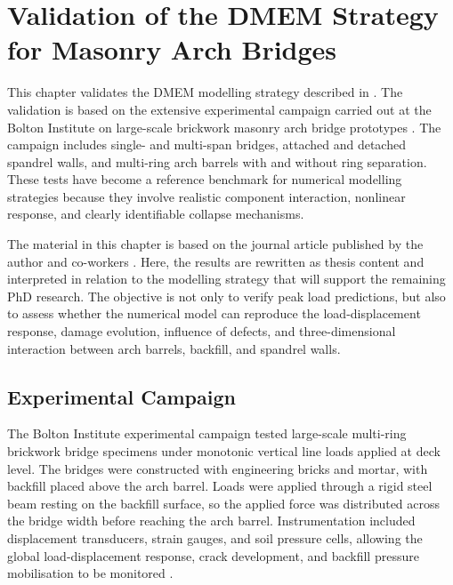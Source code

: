 

\chapter{Validation of the DMEM Strategy for Masonry Arch Bridges}
\label{cha:dmem-validation}

This chapter validates the \gls{DMEM} modelling strategy described in . The validation is based on the extensive experimental campaign carried out at the Bolton Institute on large-scale brickwork masonry arch bridge prototypes \cite{Melbourne1995,Melbourne1997}. The campaign includes single- and multi-span bridges, attached and detached spandrel walls, and multi-ring arch barrels with and without ring separation. These tests have become a reference benchmark for numerical modelling strategies because they involve realistic component interaction, nonlinear response, and clearly identifiable collapse mechanisms.

The material in this chapter is based on the journal article published by the author and co-workers \cite{Bonatte2026DMEM}. Here, the results are rewritten as thesis content and interpreted in relation to the modelling strategy that will support the remaining PhD research. The objective is not only to verify peak load predictions, but also to assess whether the numerical model can reproduce the load-displacement response, damage evolution, influence of defects, and three-dimensional interaction between arch barrels, backfill, and spandrel walls.

\section{Experimental Campaign}
\label{sec:bolton-campaign}

The Bolton Institute experimental campaign tested large-scale multi-ring brickwork bridge specimens under monotonic vertical line loads applied at deck level. The bridges were constructed with engineering bricks and mortar, with backfill placed above the arch barrel. Loads were applied through a rigid steel beam resting on the backfill surface, so the applied force was distributed across the bridge width before reaching the arch barrel. Instrumentation included displacement transducers, strain gauges, and soil pressure cells, allowing the global load-displacement response, crack development, and backfill pressure mobilisation to be monitored \cite{Melbourne1995,Melbourne1997}.

